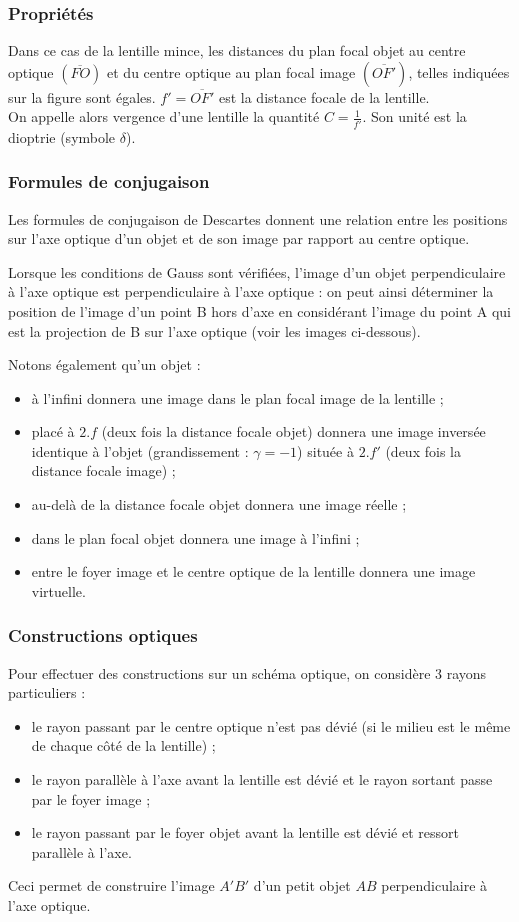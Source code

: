 \documentclass[a4paper,11pt]{article}
\begin{document}
\subsubsection{Propriétés}
Dans ce cas de la lentille mince, les distances du plan focal objet au centre optique $(\overline{FO})$ et du centre optique au plan focal image $(\overline{OF'})$, telles indiquées sur la figure sont égales. $f'=\overline{OF'}$ est la distance focale de la lentille.
\\On appelle alors vergence d'une lentille la quantité $C=\frac{1}{f'}$. Son unité est la dioptrie (symbole $\delta$).
\subsubsection{Formules de conjugaison}
Les formules de conjugaison de Descartes donnent une relation entre les positions sur l'axe optique d'un objet et de son image par rapport au centre optique.

Lorsque les conditions de Gauss sont vérifiées, l'image d'un objet perpendiculaire à l'axe optique est perpendiculaire à l'axe optique : on peut ainsi déterminer la position de l'image d'un point B hors d'axe en considérant l'image du point A qui est la projection de B sur l'axe optique (voir les images ci-dessous).

Notons également qu'un objet :
\begin{itemize}
\item à l'infini donnera une image dans le plan focal image de la lentille ;
\item placé à $2.f$ (deux fois la distance focale objet) donnera une image inversée identique à l'objet (grandissement : $\gamma  = -1$) située à $2.f'$ (deux fois la distance focale image) ;
\item au-delà de la distance focale objet donnera une image réelle ;
\item dans le plan focal objet donnera une image à l'infini ;
\item entre le foyer image et le centre optique de la lentille donnera une image virtuelle.
\end{itemize}
\subsubsection{Constructions optiques}
Pour effectuer des constructions sur un schéma optique, on considère 3 rayons particuliers :
\begin{itemize}
\item le rayon passant par le centre optique n'est pas dévié (si le milieu est le même de chaque côté de la lentille) ;
\item le rayon parallèle à l'axe avant la lentille est dévié et le rayon sortant passe par le foyer image ;
\item le rayon passant par le foyer objet avant la lentille est dévié et ressort parallèle à l'axe.
\end{itemize}
Ceci permet de construire l'image $A'B'$ d'un petit objet $AB$ perpendiculaire à l'axe optique.
\end{document}
